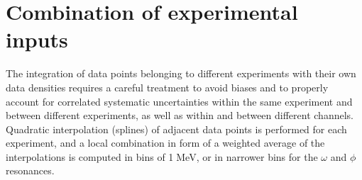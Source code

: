 \section{Combination of experimental inputs}
\label{Sec:Combination}

\sloppy
The integration of data points belonging to different experiments with their own data densities requires a careful treatment to avoid biases and to properly account for correlated systematic uncertainties within the same experiment and between different experiments, as well as within and between different channels. Quadratic interpolation (splines) of adjacent data points is performed for each experiment, and a local combination in form of a weighted average of the interpolations is computed in bins of 1$\;$MeV, or in narrower bins for the $\omega$ and $\phi$ resonances. 


